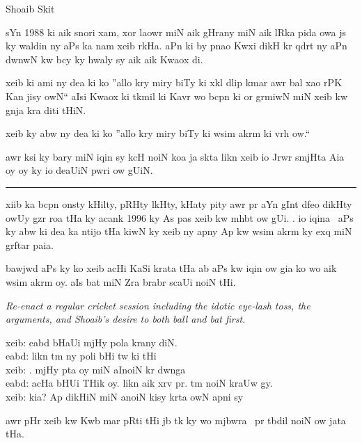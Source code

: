 \documentclass{article}
\begin{document}
\begin{center} \LARGE
	Shoaib Skit
\end{center}

\startUrdu

sYn 1988 ki aik snori xam, xor laowr miN aik gHrany miN aik lRka pida owa js ky waldin ny aPs ka nam xeib rkHa.
aPn ki by pnao Kwxi dikH kr qdrt ny aPn dwnwN kw bcy ky hwaly sy aik aik Kwaox di.

xeib ki ami ny dea ki ko ''allo kry miry biTy ki xkl dlip kmar awr bal xao rPK Kan jisy owN`` aIsi Kwaox ki tkmil ki Kavr wo bcpn ki or grmiwN miN xeib kw gnja kra diti tHiN. \hfill {}

xeib ky abw ny dea ki ko ''allo kry miry biTy ki  wsim akrm ki vrh ow.``

awr ksi ky bary miN iqin sy kcH noiN koa ja skta likn xeib io Jrwr smjHta Aia oy oy ky io deaUiN pwri ow gUiN.

\rule{\textwidth}{1pt}

xiib ka bcpn onsty kHilty, pRHty lkHty,  kHaty pity awr  pr aYn gInt dfeo  dikHty owUy gzr roa tHa ky acank 1996 ky As pas xeib kw mhbt ow gUi.
.
io iqina~ aPs ky abw ki dea ka ntijo tHa kiwN ky xeib ny apny Ap kw wsim akrm ky exq miN grftar paia.

bawjwd aPs ky ko xeib acHi KaSi  krata tHa ab aPs kw iqin ow gia ko wo aik  wsim akrm oy.
aIs bat miN Zra brabr scaUi noiN tHi.

\begin{enpara}
	\itshape
	Re-enact a regular cricket session including the idotic eye-lash toss, the arguments, and Shoaib's desire to both ball and bat first.
\end{enpara}

\vspace{0.5\baselineskip}
xeib:  eabd bHaUi mjHy pola  krany diN.\\
eabd: likn tm ny poli  bHi tw ki tHi\\
xeib: . mjHy pta oy miN aInoiN  kr dwnga\\
eabd: acHa bHUi THik oy.
likn aik xrv pr.
tm  noiN kraUw gy.\\
xeib: kia? Ap dikHiN miN anoiN kisy  krta owN apni  sy

awr pHr xeib kw Kwb mar pRti tHi jb tk ky wo mjbwra~  pr tbdil noiN ow jata tHa.
\end{document}
